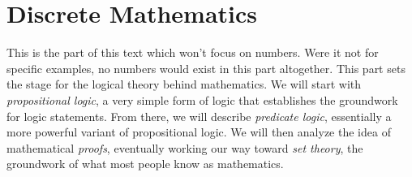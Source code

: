 \part{Discrete Mathematics}

This is the part of this text which won't focus on numbers.
Were it not for specific examples, no numbers would exist in this part altogether.
This part sets the stage for the logical theory behind mathematics. We will start with \emph{propositional logic}, a very simple form of logic that establishes the groundwork for logic statements.
From there, we will describe \emph{predicate logic}, essentially a more powerful variant of propositional logic.
We will then analyze the idea of mathematical \emph{proofs}, eventually working our way toward \emph{set theory}, the groundwork of what most people know as mathematics.

\clearpage
{}

\setcounter{section}{0}

%
%
%
%
%
%
